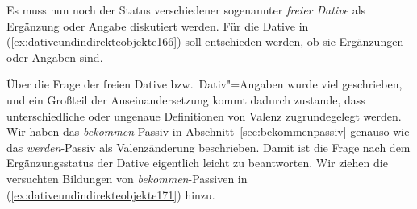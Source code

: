 

Es muss nun noch der Status verschiedener sogenannter \textit{freier Dative} als Ergänzung oder Angabe diskutiert werden.
Für die Dative in (\ref{ex:dativeundindirekteobjekte166}) soll entschieden werden, ob sie Ergänzungen oder Angaben sind.

\begin{exe}
  \ex\label{ex:dativeundindirekteobjekte166}
  \begin{xlist}
  \end{xlist}
\end{exe}


Über die Frage der freien Dative bzw.\ Dativ"=Angaben wurde viel geschrieben, und ein Großteil der Auseinandersetzung kommt dadurch zustande, dass unterschiedliche oder ungenaue Definitionen von Valenz zugrundegelegt werden.
Wir haben das \textit{bekommen}-Passiv in Abschnitt~\ref{sec:bekommenpassiv} genauso wie das \textit{werden}-Passiv als Valenzänderung beschrieben.
Damit ist die Frage nach dem Ergänzungsstatus der Dative eigentlich leicht zu beantworten.
Wir ziehen die versuchten Bildungen von \textit{bekommen}-Passiven in (\ref{ex:dativeundindirekteobjekte171}) hinzu.

\begin{exe}
  \ex\label{ex:dativeundindirekteobjekte171}
  \begin{xlist}
  \end{xlist}
\end{exe}


